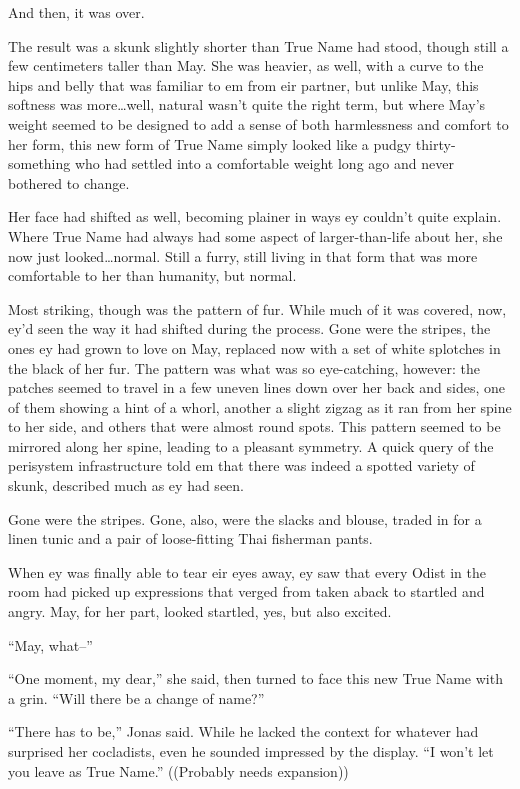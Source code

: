 And then, it was over.

The result was a skunk slightly shorter than True Name had stood, though still a few centimeters taller than May. She was heavier, as well, with a curve to the hips and belly that was familiar to em from eir partner, but unlike May, this softness was more\ldots well, natural wasn't quite the right term, but where May's weight seemed to be designed to add a sense of both harmlessness and comfort to her form, this new form of True Name simply looked like a pudgy thirty-something who had settled into a comfortable weight long ago and never bothered to change.

Her face had shifted as well, becoming plainer in ways ey couldn't quite explain. Where True Name had always had some aspect of larger-than-life about her, she now just looked\ldots normal. Still a furry, still living in that form that was more comfortable to her than humanity, but normal.

Most striking, though was the pattern of fur. While much of it was covered, now, ey'd seen the way it had shifted during the process. Gone were the stripes, the ones ey had grown to love on May, replaced now with a set of white splotches in the black of her fur. The pattern was what was so eye-catching, however: the patches seemed to travel in a few uneven lines down over her back and sides, one of them showing a hint of a whorl, another a slight zigzag as it ran from her spine to her side, and others that were almost round spots. This pattern seemed to be mirrored along her spine, leading to a pleasant symmetry. A quick query of the perisystem infrastructure told em that there was indeed a spotted variety of skunk, described much as ey had seen.

Gone were the stripes. Gone, also, were the slacks and blouse, traded in for a linen tunic and a pair of loose-fitting Thai fisherman pants.

When ey was finally able to tear eir eyes away, ey saw that every Odist in the room had picked up expressions that verged from taken aback to startled and angry. May, for her part, looked startled, yes, but also excited.

``May, what--''

``One moment, my dear,'' she said, then turned to face this new True Name with a grin. ``Will there be a change of name?''

``There has to be,'' Jonas said. While he lacked the context for whatever had surprised her cocladists, even he sounded impressed by the display. ``I won't let you leave as True Name.'' ((Probably needs expansion))

